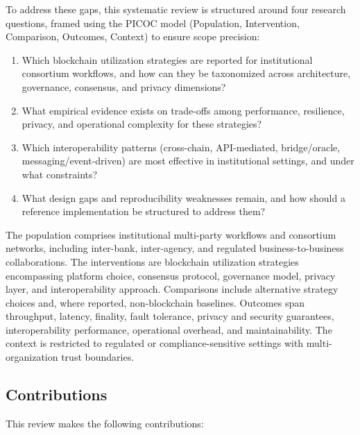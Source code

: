 \documentclass[journal]{IEEEtran}
\begin{document}
To address these gaps, this systematic review is structured around four research questions, framed using the PICOC model (Population, Intervention, Comparison, Outcomes, Context) to ensure scope precision:

\begin{enumerate}
  \item[\textbf{RQ1.}] Which blockchain utilization strategies are reported for institutional consortium workflows, and how can they be taxonomized across architecture, governance, consensus, and privacy dimensions?
  \item[\textbf{RQ2.}] What empirical evidence exists on trade-offs among performance, resilience, privacy, and operational complexity for these strategies?
  \item[\textbf{RQ3.}] Which interoperability patterns (cross-chain, API-mediated, bridge/oracle, messaging/event-driven) are most effective in institutional settings, and under what constraints?
  \item[\textbf{RQ4.}] What design gaps and reproducibility weaknesses remain, and how should a reference implementation be structured to address them?
\end{enumerate}

The population comprises institutional multi-party workflows and consortium networks, including inter-bank, inter-agency, and regulated business-to-business collaborations.
The interventions are blockchain utilization strategies encompassing platform choice, consensus protocol, governance model, privacy layer, and interoperability approach.
Comparisons include alternative strategy choices and, where reported, non-blockchain baselines.
Outcomes span throughput, latency, finality, fault tolerance, privacy and security guarantees, interoperability performance, operational overhead, and maintainability.
The context is restricted to regulated or compliance-sensitive settings with multi-organization trust boundaries.

\subsection{Contributions}

This review makes the following contributions:
\end{document}
